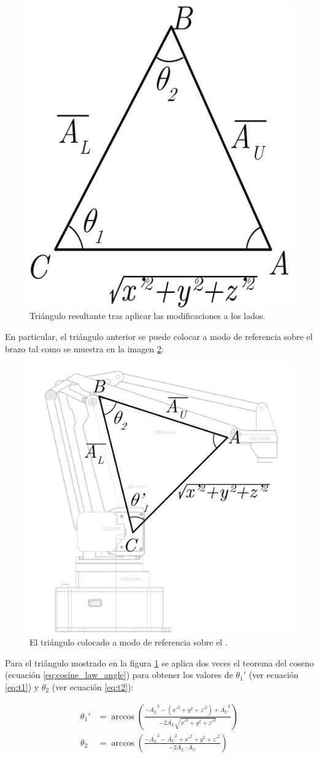 \begin{figure}[H]
    \centering
    \includegraphics[width=.4\linewidth]{pictures/ik_unitary_triangle.png}
    \caption{Triángulo resultante tras aplicar las modificaciones a los lados.}
    \label{fig:ik_triangle}
\end{figure}

En particular, el triángulo anterior se puede colocar a modo de
referencia sobre el brazo tal como se muestra en la imagen \ref{fig:u_triangle_over_arm}:

\begin{figure}[H]
    \centering
    \includegraphics[width=.6\linewidth]{pictures/ik_triangle_over_arm.png}
    \caption{El triángulo colocado a modo de referencia sobre el \pArm{}.}
    \label{fig:u_triangle_over_arm}
\end{figure}

Para el triángulo mostrado en la figura \ref{fig:ik_triangle} se aplica
dos veces el teorema del coseno (ecuación \ref{eq:cosine_law_angle}) para obtener
los valores de $\theta_1'$ (ver ecuación \ref{eq:t1}) y $\theta_2$ (ver ecuación \ref{eq:t2}):

\begin{align}
    \theta_1' & = \arccos{\left(\frac{-\overline{A_L}^2 - \left(x'^2 + y^2 + z'^2\right) + \overline{A_U}^2} %
    {-2 \overline{A_L} \sqrt{x'^2 + y^2 + z'^2}}\right)} \label{eq:t1} \\[2ex]
    \theta_2 & = \arccos{\left(\frac{-\overline{A_L}^2 - \overline{A_U}^2 + x'^2 + y^2 + z'^2} %
    {-2 \overline{A_L} \cdot \overline{A_U}}\right)} \label{eq:t2}
\end{align}

